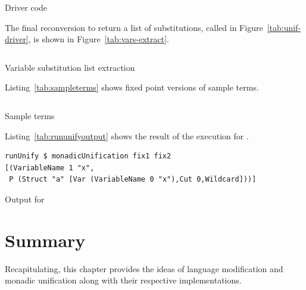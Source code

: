 \documentclass[thesis-solanki.tex]{subfiles}
\begin{document}
\begin{code-list}[H]
  \begin{singlespace}
    \inputminted[linenos]{haskell}{haskell-proto1-unify-driver.hs}
  \end{singlespace}
  \caption{Driver code}
  \label{tab:unif-driver}
\end{code-list}


The final reconversion to return a list of substitutions, called  in
Figure~\ref{tab:unif-driver}, is shown in Figure~\ref{tab:vars-extract}.
\begin{code-list}[H]
  \begin{singlespace}
    \inputminted[linenos]{haskell}{haskell-proto1-unify-out.hs}
  \end{singlespace}
  \caption{Variable substitution list extraction}
  \label{tab:vars-extract}
\end{code-list}

Listing~\ref{tab:sampleterms} shows fixed point versions of sample terms.

\begin{code-list}[H]
\begin{singlespace}
\inputminted[linenos]{haskell}{haskell-proto1-sample-terms.hs}
\end{singlespace}
\caption{Sample terms}
\label{tab:sampleterms}
\end{code-list}

Listing~\ref{tab:rununifyoutput} shows the result of the execution for .

\begin{code-list}[H]
\begin{singlespace}
\begin{verbatim}
runUnify $ monadicUnification fix1 fix2
[(VariableName 1 "x",
 P (Struct "a" [Var (VariableName 0 "x"),Cut 0,Wildcard]))]
\end{verbatim}
\end{singlespace}
\caption{Output for }
\label{tab:rununifyoutput}
\end{code-list}


\section{Summary}
Recapitulating, this chapter provides the ideas of language modification and monadic unification along with their
respective implementations.


\ifMain\ifDraft
\begin{scope}
  \nolinenumbers
  \enotesize
  \par
  \begin{singlespace}
  \setlength{\parskip}{12pt plus 2pt minus 1pt}
  \theendnotes
  \par
  \end{singlespace}
\end{scope}
\fi\fi
\end{document}
